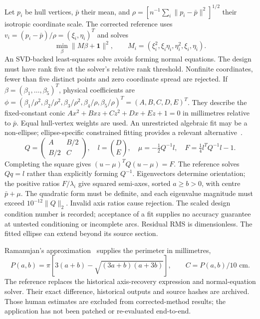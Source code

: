 \documentclass[11pt,a4paper]{article}
\begin{document}
Let $p_i$ be hull vertices, $\bar p$ their mean, and
$\rho=[n^{-1}\sum_i\|p_i-\bar p\|^2]^{1/2}$ their isotropic coordinate scale.
The corrected reference uses $v_i=(p_i-\bar p)/\rho=(\xi_i,\eta_i)^T$ and solves
\begin{equation}
 \min_\beta\|M\beta+\mathbf1\|^2,\qquad
 M_i=(\xi_i^2,\xi_i\eta_i,\eta_i^2,\xi_i,\eta_i).
 \label{eq:fit}
\end{equation}
An SVD-backed least-squares solve avoids forming normal equations. The design must have rank five at the solver's relative rank threshold. Nonfinite coordinates, fewer than five distinct points and zero coordinate spread are rejected. If $\beta=(\beta_1,\ldots,\beta_5)^T$, physical coefficients are
$\phi=(\beta_1/\rho^2,\beta_2/\rho^2,\beta_3/\rho^2,\beta_4/\rho,\beta_5/\rho)^T=(A,B,C,D,E)^T$.
They describe the fixed-constant conic $Ax^2+Bxz+Cz^2+Dx+Ez+1=0$ in millimetres relative to $\bar p$. Equal hull-vertex weights are used. An unrestricted algebraic fit may be a non-ellipse; ellipse-specific constrained fitting provides a relevant alternative~\cite{fitzgibbon1999direct}.
\begin{equation}
 Q=\begin{pmatrix}A&B/2\\B/2&C\end{pmatrix},\quad l=\binom DE,
 \quad \mu=-\tfrac12Q^{-1}l,\quad
 F=\tfrac14l^TQ^{-1}l-1.
 \label{eq:recover}
\end{equation}
Completing the square gives $(u-\mu)^TQ(u-\mu)=F$. The reference solves $Qq=l$ rather than explicitly forming $Q^{-1}$. Eigenvectors determine orientation; the positive ratios $F/\lambda_i$ give squared semi-axes, sorted $a\geq b>0$, with centre $\bar p+\mu$. The quadratic form must be definite, and each eigenvalue magnitude must exceed $10^{-12}\|Q\|_2$. Invalid axis ratios cause rejection. The scaled design condition number is recorded; acceptance of a fit supplies no accuracy guarantee at untested conditioning or incomplete arcs. Residual RMS is dimensionless. The fitted ellipse can extend beyond its source section.

Ramanujan's approximation~\cite{ramanujan1914modular} supplies the perimeter in millimetres,
\begin{equation}
 P(a,b)=\pi[3(a+b)-\sqrt{(3a+b)(a+3b)}],\qquad C=P(a,b)/10\text{ cm}.
 \label{eq:perimeter}
\end{equation}
The reference replaces the historical axis-recovery expression and normal-equation solver. Their exact difference, historical outputs and source hashes are archived. Those human estimates are excluded from corrected-method results; the application has not been patched or re-evaluated end-to-end.
\end{document}

